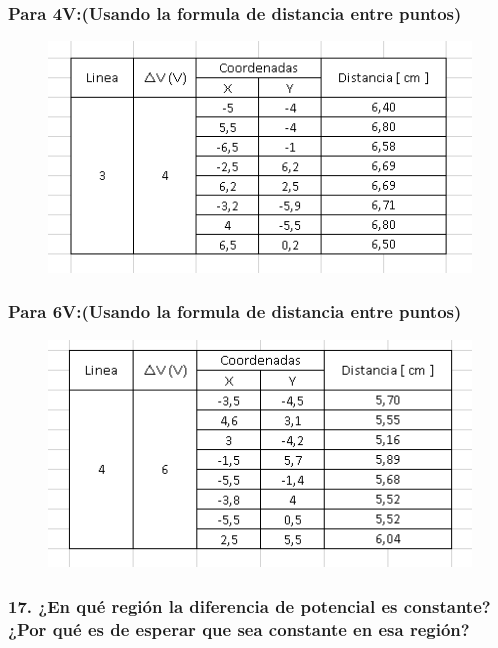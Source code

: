 \documentclass[letterpaper, 12pt]{report}
\begin{document}
\subsubsection*{Para 4V:\@(Usando la formula de distancia entre puntos)}

\begin{figure}[H]
	\begin{center}
		\includegraphics[scale = 1]{./Images/Concentricos1.png}
	\end{center}
\end{figure}

\subsubsection*{Para 6V:\@(Usando la formula de distancia entre puntos)}

\begin{figure}[H]
	\begin{center}
		\includegraphics[scale = 1]{./Images/Concentricos2.PNG}
	\end{center}
\end{figure}

\subsubsection{17. ¿En qué región la diferencia de potencial es constante? ¿Por qué es de esperar que
	sea constante en esa región?}
\end{document}
